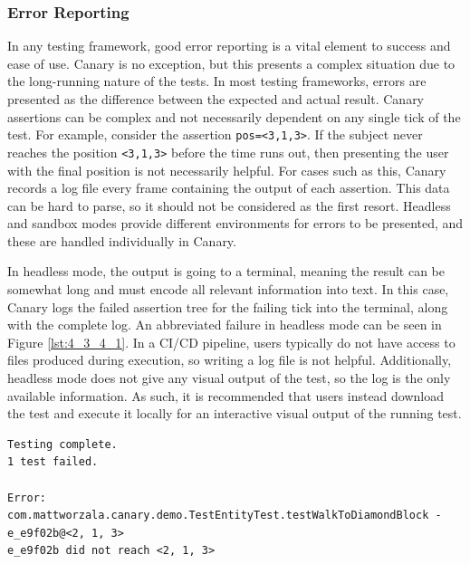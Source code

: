 \documentclass[12pt]{article}
\def\code#1{\texttt{#1}}
\begin{document}
\begin{onehalfspacing}
\subsubsection{Error Reporting}

In any testing framework, good error reporting is a vital element to
success and ease of use. Canary is no exception, but this presents a
complex situation due to the long-running nature of the tests. In most
testing frameworks, errors are presented as the difference between the
expected and actual result. Canary assertions can be complex and not
necessarily dependent on any single tick of the test. For example,
consider the assertion \code{pos=\textless3,1,3\textgreater{}}. If the subject
never reaches the position \code{\textless3,1,3\textgreater{}} before the time
runs out, then presenting the user with the final position is not
necessarily helpful. For cases such as this, Canary records a log file
every frame containing the output of each assertion. This data can be
hard to parse, so it should not be considered as the first resort.
Headless and sandbox modes provide different environments for errors to
be presented, and these are handled individually in Canary.

In headless mode, the output is going to a terminal, meaning the result
can be somewhat long and must encode all relevant information into text.
In this case, Canary logs the failed assertion tree for the failing tick
into the terminal, along with the complete log. An abbreviated failure
in headless mode can be seen in Figure \ref{lst:4_3_4_1}. In a CI/CD pipeline,
users typically do not have access to files produced during execution,
so writing a log file is not helpful. Additionally, headless mode does
not give any visual output of the test, so the log is the only available
information. As such, it is recommended that users instead download the
test and execute it locally for an interactive visual output of the
running test.



\begin{listing}[H]
\begin{verbatim}
Testing complete.
1 test failed.

Error: com.mattworzala.canary.demo.TestEntityTest.testWalkToDiamondBlock - e_e9f02b@<2, 1, 3>
e_e9f02b did not reach <2, 1, 3>


\end{verbatim}
\end{listing}
\end{onehalfspacing}
\end{document}
